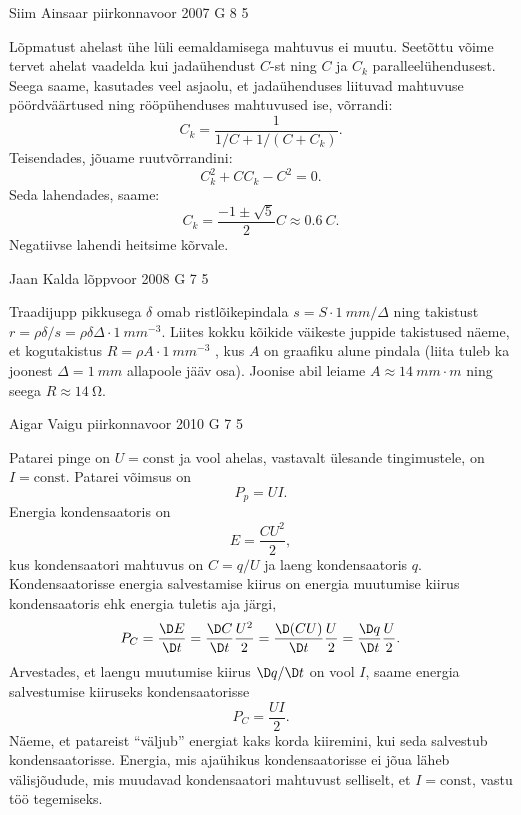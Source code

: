 \documentclass[11pt]{article}
\begin{document}
{%
{Siim Ainsaar} %
{piirkonnavoor} %
{2007} %
{G 8} %
{5} %
{

\ifSolution
Lõpmatust ahelast ühe lüli eemaldamisega mahtuvus ei muutu. Seetõttu võime tervet ahelat vaadelda kui jadaühendust $C$-st ning $C$ ja $C_k$ paralleelühendusest. Seega saame, kasutades veel asjaolu, et jadaühenduses liituvad mahtuvuse pöördväärtused ning rööpühenduses mahtuvused ise, võrrandi:
\[
C_{k}=\frac{1}{1 / C+1 /\left(C+C_{k}\right)}.
\]
Teisendades, jõuame ruutvõrrandini:
\[
C_{k}^{2}+C C_{k}-C^{2}=0.
\]
Seda lahendades, saame:
\[
C_{k}=\frac{-1 \pm \sqrt{5}}{2} C \approx \SI{0,6}{C}.
\]
Negatiivse lahendi heitsime kõrvale.
\fi
}

{Jaan Kalda} %
{lõppvoor} %
{2008} %
{G 7} %
{5} %
{

\ifSolution
Traadijupp pikkusega $\delta$ omab ristlõikepindala $s = S \cdot \SI{1}{mm}/\Delta$ ning takistust $r = \rho \delta /s = \rho \delta \Delta \cdot \SI{1}{mm^{-3}}$. Liites kokku kõikide väikeste juppide takistused näeme, et kogutakistus $R = \rho A \cdot \SI{1}{mm^{-3}}$ , kus $A$ on graafiku alune pindala (liita tuleb ka joonest $\Delta = \SI{1}{mm}$ allapoole jääv osa). Joonise abil leiame $A \approx \SI{14}{mm\cdot m}$ ning seega $R \approx \SI{14}{\ohm}$. 
\fi
}

{Aigar Vaigu} %
{piirkonnavoor} %
{2010} %
{G 7} %
{5} %
{

\ifSolution
Patarei pinge on $U=\text{const}$ ja vool ahelas, vastavalt ülesande tingimustele, on $I=\text{const}$. Patarei võimsus on
\[P_p=UI. \]
Energia kondensaatoris on
\[E=\frac{CU^2}{2}, \]
kus kondensaatori mahtuvus on $C=q/U$ ja laeng kondensaatoris $q$.
Kondensaatorisse energia salvestamise kiirus on energia muutumise kiirus kondensaatoris ehk energia tuletis aja järgi,
\[P_C=\frac{\D E}{\D t}=\frac{\D C}{\D t}\frac{U^2}{2}=\frac{\D (CU)}{\D t}\frac{U}{2}=\frac{\D q}{\D t}\frac{U}{2}.\]
Arvestades, et laengu muutumise kiirus $\D q/\D t$ on vool $I$, saame energia salvestumise kiiruseks kondensaatorisse
\[P_C=\frac{UI}{2}.\]
Näeme, et patareist \enquote{väljub} energiat kaks korda kiiremini, kui seda salvestub kondensaatorisse. Energia, mis ajaühikus kondensaatorisse ei jõua läheb välisjõudude, mis muudavad kondensaatori mahtuvust selliselt, et $I=\text{const}$, vastu töö tegemiseks.
\fi
}

}
\end{document}
